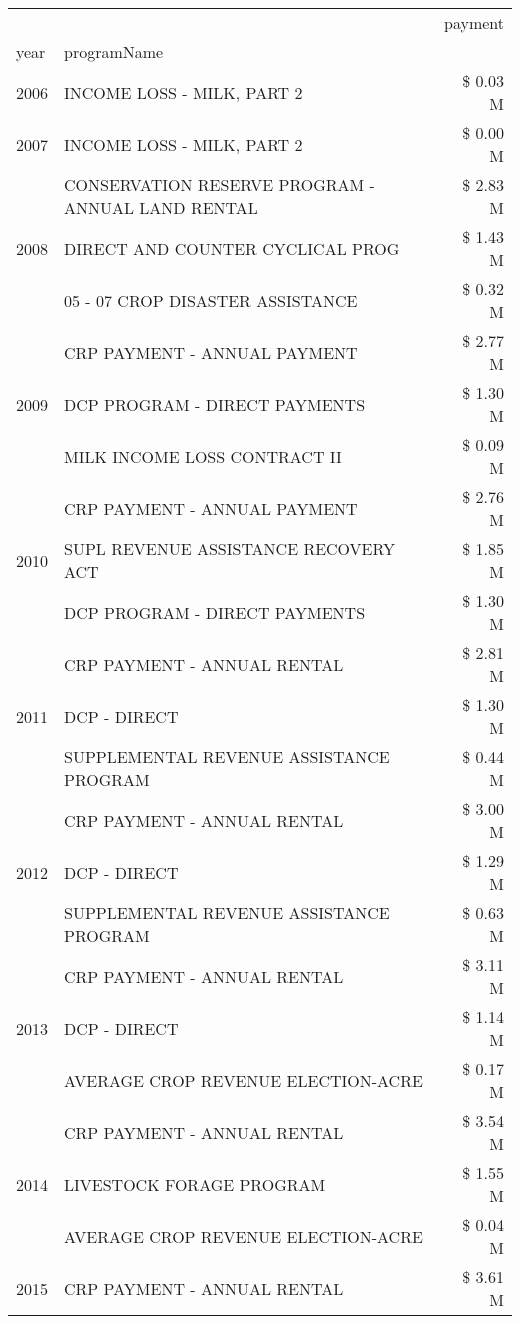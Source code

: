 \begin{tabular}{llr}
\toprule
 &  & payment \\
year & programName &  \\
\midrule
2006 & INCOME LOSS - MILK, PART 2 & \$ 0.03 M \\
\cline{1-3}
2007 & INCOME LOSS - MILK, PART 2 & \$ 0.00 M \\
\cline{1-3}
\multirow[t]{3}{*}{2008} & CONSERVATION RESERVE PROGRAM - ANNUAL LAND RENTAL & \$ 2.83 M \\
 & DIRECT AND COUNTER CYCLICAL PROG & \$ 1.43 M \\
 & 05 - 07 CROP DISASTER ASSISTANCE & \$ 0.32 M \\
\cline{1-3}
\multirow[t]{3}{*}{2009} & CRP PAYMENT - ANNUAL PAYMENT & \$ 2.77 M \\
 & DCP PROGRAM - DIRECT PAYMENTS & \$ 1.30 M \\
 & MILK INCOME LOSS CONTRACT II & \$ 0.09 M \\
\cline{1-3}
\multirow[t]{3}{*}{2010} & CRP PAYMENT - ANNUAL PAYMENT & \$ 2.76 M \\
 & SUPL REVENUE ASSISTANCE RECOVERY ACT & \$ 1.85 M \\
 & DCP PROGRAM - DIRECT PAYMENTS & \$ 1.30 M \\
\cline{1-3}
\multirow[t]{3}{*}{2011} & CRP PAYMENT - ANNUAL RENTAL & \$ 2.81 M \\
 & DCP - DIRECT & \$ 1.30 M \\
 & SUPPLEMENTAL REVENUE ASSISTANCE PROGRAM & \$ 0.44 M \\
\cline{1-3}
\multirow[t]{3}{*}{2012} & CRP PAYMENT - ANNUAL RENTAL & \$ 3.00 M \\
 & DCP - DIRECT & \$ 1.29 M \\
 & SUPPLEMENTAL REVENUE ASSISTANCE PROGRAM & \$ 0.63 M \\
\cline{1-3}
\multirow[t]{3}{*}{2013} & CRP PAYMENT - ANNUAL RENTAL & \$ 3.11 M \\
 & DCP - DIRECT & \$ 1.14 M \\
 & AVERAGE CROP REVENUE ELECTION-ACRE & \$ 0.17 M \\
\cline{1-3}
\multirow[t]{3}{*}{2014} & CRP PAYMENT - ANNUAL RENTAL & \$ 3.54 M \\
 & LIVESTOCK FORAGE PROGRAM & \$ 1.55 M \\
 & AVERAGE CROP REVENUE ELECTION-ACRE & \$ 0.04 M \\
\cline{1-3}
\multirow[t]{3}{*}{2015} & CRP PAYMENT - ANNUAL RENTAL & \$ 3.61 M \\

\end{tabular}
